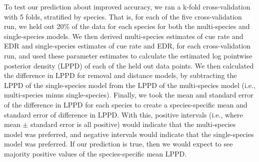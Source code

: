 \documentclass[12pt]{article}
\begin{document}
\par To test our prediction about improved accuracy, we ran a k-fold cross-validation with 5 folds, stratified by species.
That is, for each of the five cross-validation run, we held out 20\% of the data for each species for both the multi-species and single-species models. 
We then derived multi-species estimates of cue rate and EDR and single-species estimates of cue rate and EDR, for each cross-validation run, and used these parameter estimates to calculate the estimated log pointwise posterior density (LPPD) of each of the held out data points. 
We then calculated the difference in LPPD for removal and distance models, by subtracting the LPPD of the single-species model from the LPPD of the multi-species model (i.e., multi-species minus single-species).
Finally, we took the mean and standard error of the difference in LPPD for each species to create a species-specific mean and standard error of difference in LPPD.
With this, positive intervals (i.e., where mean $\pm$ standard error is all positive) would indicate that the multi-species model was preferred, and negative intervals would indicate that the single-species model was preferred.
If our prediction is true, then we would expect to see majority positive values of the species-specific mean LPPD.
\end{document}
